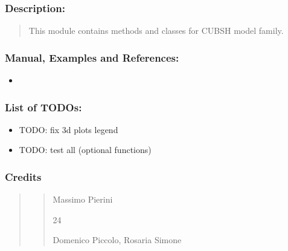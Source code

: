 \documentclass[letterpaper,10pt,english]{sphinxmanual}
\begin{document}
\subsubsection{Description:}
\label{\detokenize{cubmods:id32}}\begin{quote}

\sphinxAtStartPar
This module contains methods and classes
for CUBSH model family.
\end{quote}


\subsubsection{Manual, Examples and References:}
\label{\detokenize{cubmods:id33}}\begin{itemize}
\item {} 
\sphinxAtStartPar
{}

\end{itemize}


\subsubsection{List of TODOs:}
\label{\detokenize{cubmods:id34}}\begin{itemize}
\item {} 
\sphinxAtStartPar
TODO: fix 3d plots legend

\item {} 
\sphinxAtStartPar
TODO: test all  (optional functions)

\end{itemize}


\subsubsection{Credits}
\label{\detokenize{cubmods:id35}}\begin{quote}
\begin{quote}\begin{description}
\sphinxAtStartPar
Massimo Pierini

\sphinxhyphen{}24

\sphinxAtStartPar
Domenico Piccolo, Rosaria Simone

\sphinxAtStartPar
{}

\end{description}\end{quote}
\end{quote}
\end{document}

